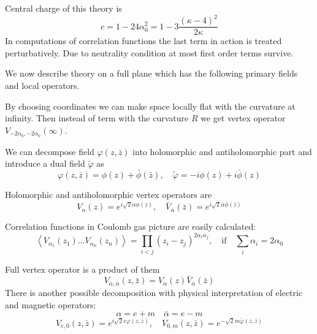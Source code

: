 \documentclass[12pt]{article}
\begin{document}
Central charge of this theory is
\begin{equation}
  \label{eq:130}
  c=1-24\alpha_{0}^{2}=1-3\frac{(\kappa-4)^{2}}{2\kappa}
\end{equation}
In computations of correlation functions the last term in action is treated perturbatively. Due to
neutrality condition at most first order terms survive. 

We now describe theory on a full plane which has the following primary fields and local operators. 

By choosing coordinates we can make space locally flat with the curvature at infinity. Then instead
of term with the curvature $R$ we get vertex operator $V_{-2\alpha_{0},-2\alpha_{0}}(\infty)$.

We can decompose field $\varphi(z,\bar z)$ into holomorphic and antiholomorphic part and introduce a
dual field $\tilde\varphi$ as
\begin{equation}
  \label{eq:131}
  \varphi(z,\bar z)=\phi(z)+\bar\phi(\bar z),\quad \tilde\varphi=-i\phi(z)+i\bar\phi(z)
\end{equation}

Holomorphic and antiholomorphic vertex operators are
\begin{equation}
  \label{eq:132}
  V_{\alpha}(z)=e^{i\sqrt{2}\alpha \phi(z)},\quad \bar V_{\bar\alpha}(\bar z)=e^{i\sqrt{2}\bar\alpha
    \bar \phi(\bar z)}
\end{equation}

Correlation functions in Coulomb gas picture are easily calculated:
\begin{equation}
  \label{eq:157}
  \left< V_{\alpha_{1}}(z_{1})\dots
    V_{\alpha_{n}}(z_{n})\right>=\prod_{i<j}(z_{i}-z_{j})^{2\alpha_{i}\alpha_{j}}, \quad \mbox{if}\quad \sum_{i}\alpha_{i}=2\alpha_{0}
\end{equation}

Full vertex operator is a product of them
\begin{equation}
  \label{eq:133}
  V_{\alpha,\bar\alpha}(z,\bar z)=V_{\alpha}(z)\bar V_{\bar \alpha}(\bar z)
\end{equation}
There is another possible decomposition with physical interpretation of electric and magnetic operators:
\begin{equation}
  \label{eq:134}
  \alpha=e+m\quad \bar\alpha=e-m
\end{equation}
\begin{equation}
  \label{eq:135}
  V_{e,0}(z,\bar z)=e^{i\sqrt{2} e\varphi(z,\bar z)},\quad   V_{0,m}(z,\bar z)=e^{-\sqrt{2} m\tilde\varphi(z,\bar z)}
\end{equation}
\end{document}
